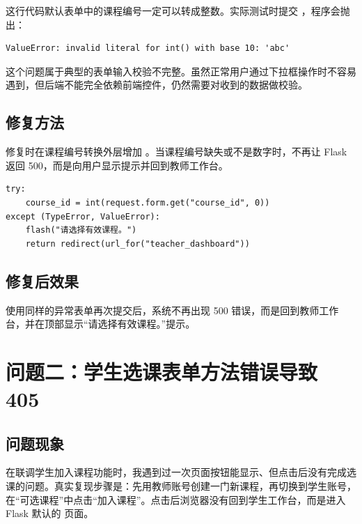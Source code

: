 \documentclass[UTF8,12pt]{ctexart}
\begin{document}
这行代码默认表单中的课程编号一定可以转成整数。实际测试时提交 ，程序会抛出：

\begin{verbatim}
ValueError: invalid literal for int() with base 10: 'abc'
\end{verbatim}

这个问题属于典型的表单输入校验不完整。虽然正常用户通过下拉框操作时不容易遇到，但后端不能完全依赖前端控件，仍然需要对收到的数据做校验。

\subsection{修复方法}

修复时在课程编号转换外层增加 。当课程编号缺失或不是数字时，不再让 Flask 返回 500，而是向用户显示提示并回到教师工作台。

\begin{verbatim}
try:
    course_id = int(request.form.get("course_id", 0))
except (TypeError, ValueError):
    flash("请选择有效课程。")
    return redirect(url_for("teacher_dashboard"))
\end{verbatim}

\subsection{修复后效果}

使用同样的异常表单再次提交后，系统不再出现 500 错误，而是回到教师工作台，并在顶部显示“请选择有效课程。”提示。


\newpage

\section{问题二：学生选课表单方法错误导致 405}

\subsection{问题现象}

在联调学生加入课程功能时，我遇到过一次页面按钮能显示、但点击后没有完成选课的问题。真实复现步骤是：先用教师账号创建一门新课程，再切换到学生账号，在“可选课程”中点击“加入课程”。点击后浏览器没有回到学生工作台，而是进入 Flask 默认的  页面。

\end{document}

